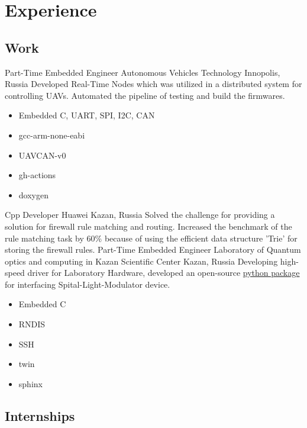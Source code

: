 \section{Experience}


\subsection{\textbf{Work}}

        {Part-Time Embedded Engineer}
        {Autonomous Vehicles Technology}
        {Innopolis, Russia}
        {
        Developed Real-Time Nodes which was utilized in a distributed system for controlling UAVs. Automated the pipeline of testing and build the firmwares.
        } 
        {
        \begin{itemize}
            \item Embedded C, UART, SPI, I2C, CAN
            \item gcc-arm-none-eabi
            \item UAVCAN-v0
            \item gh-actions
            \item doxygen
        \end{itemize}
        }
        {Cpp Developer}
        {Huawei}
        {Kazan, Russia}
        {
            Solved the challenge for providing a solution for firewall rule matching and routing. 
            Increased the benchmark of the rule matching task by 60\% because of using the efficient data structure 'Trie' for storing the firewall rules. 
        }
        {}
        {Part-Time Embedded Engineer}
        {Laboratory of Quantum optics and  computing  in  Kazan Scientific Center}
        {Kazan, Russia}
        {
        Developing high-speed driver for Laboratory Hardware, developed an open-source \href{https://pypi.org/project/holoeye-embedded/}{\color{blue}python package} for interfacing Spital-Light-Modulator device.    
        } 
        {
        \begin{itemize}
            \item Embedded C
            \item RNDIS
            \item SSH
            \item twin
            \item sphinx
        \end{itemize}
        }



\subsection{\textbf{Internships}}


